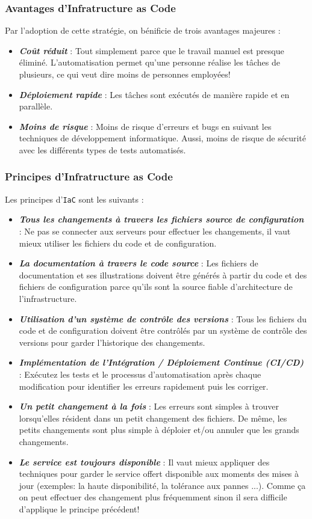\documentclass[a4paper,11pt,oneside]{report}
\begin{document}
\subsubsection{Avantages d'Infratructure as Code}

Par l'adoption de cette stratégie, on bénificie de trois avantages majeures :
\begin{itemize}
  \item\textbf{\emph{Coût réduit}} : Tout simplement parce que le travail manuel est presque éliminé. L'automatisation permet qu'une personne réalise les tâches de plusieurs, ce qui veut dire moins de personnes employées!
  \item\textbf{\emph{Déploiement rapide}} : Les tâches sont exécutés de manière rapide et en parallèle. 
  \item\textbf{\emph{Moins de risque}} : Moins de risque d'erreurs et bugs en suivant les techniques de développement informatique. Aussi, moins de risque de sécurité avec les différents types de tests automatisés.
\end{itemize}

\subsubsection{Principes d'Infratructure as Code}

Les principes d'\texttt{IaC} sont les suivants :
\begin{itemize}
  \item\textbf{\emph{Tous les changements à travers les fichiers source de configuration}} : Ne pas se connecter aux serveurs pour effectuer les changements, il vaut mieux utiliser les fichiers du code et de configuration.
  \item\textbf{\emph{La documentation à travers le code source}} : Les fichiers de documentation et ses illustrations doivent être générés à partir du code et des fichiers de configuration parce qu'ils sont la source fiable d'architecture de l'infrastructure.
  \item\textbf{\emph{Utilisation d'un système de contrôle des versions}} : Tous les fichiers du code et de configuration doivent être contrôlés par un système de contrôle des versions pour garder l'historique des changements.
  \item\textbf{\emph{Implémentation de l'Intégration / Déploiement Continue (CI/CD)}} : Exécutez les tests et le processus d'automatisation après chaque modification pour identifier les erreurs rapidement puis les corriger. 
  \item\textbf{\emph{Un petit changement à la fois}} : Les erreurs sont simples à trouver lorsqu'elles résident dans un petit changement des fichiers. De même, les petits changements sont plus simple à déploier et/ou annuler que les grands changements.
  \item\textbf{\emph{Le service est toujours disponible}} : Il vaut mieux appliquer des techniques pour garder le service offert disponible aux moments des mises à jour (exemples: la haute disponibilité, la tolérance aux pannes ...). Comme ça on peut effectuer des changement plus fréquemment sinon il sera difficile d'applique le principe précédent!
\end{itemize}
\end{document}
